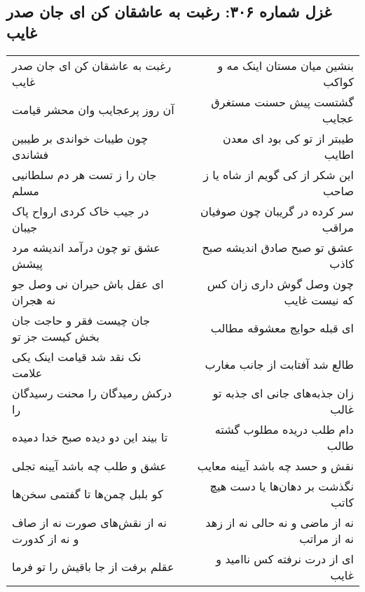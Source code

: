 \begin{center}
\section*{غزل شماره ۳۰۶: رغبت به عاشقان کن ای جان صدر غایب}
\label{sec:0306}
\begin{longtable}{l p{0.5cm} r}
رغبت به عاشقان کن ای جان صدر غایب
&&
بنشین میان مستان اینک مه و کواکب
\\
آن روز پرعجایب وان محشر قیامت
&&
گشتست پیش حسنت مستغرق عجایب
\\
چون طیبات خواندی بر طیبین فشاندی
&&
طیبتر از تو کی بود ای معدن اطایب
\\
جان را ز تست هر دم سلطانیی مسلم
&&
این شکر از کی گویم از شاه یا ز صاحب
\\
در جیب خاک کردی ارواح پاک جیبان
&&
سر کرده در گریبان چون صوفیان مراقب
\\
عشق تو چون درآمد اندیشه مرد پیشش
&&
عشق تو صبح صادق اندیشه صبح کاذب
\\
ای عقل باش حیران نی وصل جو نه هجران
&&
چون وصل گوش داری زان کس که نیست غایب
\\
جان چیست فقر و حاجت جان بخش کیست جز تو
&&
ای قبله حوایج معشوقه مطالب
\\
نک نقد شد قیامت اینک یکی علامت
&&
طالع شد آفتابت از جانب مغارب
\\
درکش رمیدگان را محنت رسیدگان را
&&
زان جذبه‌های جانی ای جذبه تو غالب
\\
تا بیند این دو دیده صبح خدا دمیده
&&
دام طلب دریده مطلوب گشته طالب
\\
عشق و طلب چه باشد آیینه تجلی
&&
نقش و حسد چه باشد آیینه معایب
\\
کو بلبل چمن‌ها تا گفتمی سخن‌ها
&&
نگذشت بر دهان‌ها یا دست هیچ کاتب
\\
نه از نقش‌های صورت نه از صاف و نه از کدورت
&&
نه از ماضی و نه حالی نه از زهد نه از مراتب
\\
عقلم برفت از جا باقیش را تو فرما
&&
ای از درت نرفته کس ناامید و غایب
\\
\end{longtable}
\end{center}
